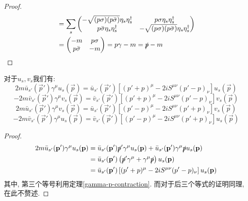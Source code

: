 \begin{proof}
\begin{align}
        &=\sum_s\begin{pmatrix}
            -\sqrt{(p\sigma)(p\bar\sigma)}\eta_s\eta_s^\dagger & p\sigma\eta_s\eta_s^\dagger\\
            p\bar\sigma\eta_s\eta_s^\dagger & -\sqrt{(p\sigma)(p\bar\sigma)}\eta_s\eta_s^\dagger
        \end{pmatrix}\notag\\
        &=\begin{pmatrix}
            -m & p\sigma\\
            p\bar\sigma & -m
        \end{pmatrix}=p\gamma-m=\slashed p-m
    \end{align}
\end{proof}

\begin{theorem}[Gordon恒等式]\label{ugammau-contraction}
    对于$u_s, v_s$我们有\cite{sredinicki-ugammau}:
    \begin{equation}
        2m\bar u_{s'}(\vec p')\gamma^\mu u_s(\vec p)=\bar u_{s'}(\vec p')\left[(p'+p)^\mu-2iS^{\mu\nu}(p'-p)_\nu\right]u_s(\vec p)
    \end{equation}
    \begin{equation}
        -2m\bar v_{s'}(\vec p')\gamma^\mu v_s(\vec p)=\bar v_{s'}(\vec p')\left[(p'+p)^\mu-2iS^{\mu\nu}(p'-p)_\nu\right]v_s(\vec p)
    \end{equation}
    \begin{equation}
        2m\bar u_{s'}(\vec p')\gamma^\mu v_s(\vec p)=\bar u_{s'}(\vec p')\left[(p'-p)^\mu-2iS^{\mu\nu}(p'+p)_\nu\right]v_s(\vec p)
    \end{equation}
    \begin{equation}
        -2m\bar v_{s'}(\vec p')\gamma^\mu u_s(\vec p)=\bar v_{s'}(\vec p')\left[(p'-p)^\mu-2iS^{\mu\nu}(p'+p)_\nu\right]u_s(\vec p)
    \end{equation}
\end{theorem}
\begin{proof}
    \begin{align}
        2m\bar u_{s'}(\vec p')\gamma^\mu u_s(\vec p)&=\bar u_{s'}(\vec p')\slashed p'\gamma^\mu u_s(\vec p)+\bar u_{s'}(\vec p')\gamma^\mu\slashed pu_s(\vec p)\\
        &=\bar u_{s'}(\vec p')\left(\slashed p'\gamma^\mu+\gamma^\mu\slashed p\right)u_s(\vec p)\\
        &=\bar u_{s'}(\vec p')\left[(p'+p)^\mu-2iS^{\mu\nu}(p'-p)_\nu\right]u_s(\vec p)
    \end{align}
    其中, 第三个等号利用定理\ref{gamma-p-contraction}. 而对于后三个等式的证明同理, 在此不赘述.
\end{proof}

